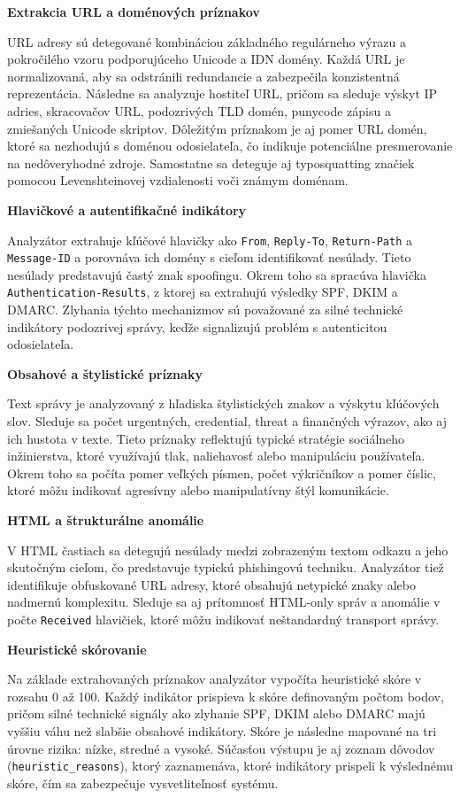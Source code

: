\documentclass[conference]{IEEEtran}
\begin{document}
\textbf{Extrakcia URL a doménových príznakov}

URL adresy sú detegované kombináciou základného regulárneho výrazu a pokročilého vzoru podporujúceho Unicode a IDN domény. Každá URL je normalizovaná, aby sa odstránili redundancie a zabezpečila konzistentná reprezentácia. Následne sa analyzuje hostiteľ URL, pričom sa sleduje výskyt IP adries, skracovačov URL, podozrivých TLD domén, punycode zápisu a zmiešaných Unicode skriptov. Dôležitým príznakom je aj pomer URL domén, ktoré sa nezhodujú s doménou odosielateľa, čo indikuje potenciálne presmerovanie na nedôveryhodné zdroje. Samostatne sa deteguje aj typosquatting značiek pomocou Levenshteinovej vzdialenosti voči známym doménam.

\textbf{Hlavičkové a autentifikačné indikátory}

Analyzátor extrahuje kľúčové hlavičky ako \texttt{From}, \texttt{Reply-To}, \texttt{Return-Path} a \texttt{Message-ID} a porovnáva ich domény s cieľom identifikovať nesúlady. Tieto nesúlady predstavujú častý znak spoofingu. Okrem toho sa spracúva hlavička \texttt{Authentication-Results}, z ktorej sa extrahujú výsledky SPF, DKIM a DMARC. Zlyhania týchto mechanizmov sú považované za silné technické indikátory podozrivej správy, keďže signalizujú problém s autenticitou odosielateľa.

\textbf{Obsahové a štylistické príznaky}

Text správy je analyzovaný z hľadiska štylistických znakov a výskytu kľúčových slov. Sleduje sa počet urgentných, credential, threat a finančných výrazov, ako aj ich hustota v texte. Tieto príznaky reflektujú typické stratégie sociálneho inžinierstva, ktoré využívajú tlak, naliehavosť alebo manipuláciu používateľa. Okrem toho sa počíta pomer veľkých písmen, počet výkričníkov a pomer číslic, ktoré môžu indikovať agresívny alebo manipulatívny štýl komunikácie.

\textbf{HTML a štrukturálne anomálie}

V HTML častiach sa detegujú nesúlady medzi zobrazeným textom odkazu a jeho skutočným cieľom, čo predstavuje typickú phishingovú techniku. Analyzátor tiež identifikuje obfuskované URL adresy, ktoré obsahujú netypické znaky alebo nadmernú komplexitu. Sleduje sa aj prítomnosť HTML-only správ a anomálie v počte \texttt{Received} hlavičiek, ktoré môžu indikovať neštandardný transport správy.

\textbf{Heuristické skórovanie}

Na základe extrahovaných príznakov analyzátor vypočíta heuristické skóre v rozsahu 0 až 100. Každý indikátor prispieva k skóre definovaným počtom bodov, pričom silné technické signály ako zlyhanie SPF, DKIM alebo DMARC majú vyššiu váhu než slabšie obsahové indikátory. Skóre je následne mapované na tri úrovne rizika: nízke, stredné a vysoké. Súčasťou výstupu je aj zoznam dôvodov (\texttt{heuristic\_reasons}), ktorý zaznamenáva, ktoré indikátory prispeli k výslednému skóre, čím sa zabezpečuje vysvetliteľnosť systému.
\end{document}
